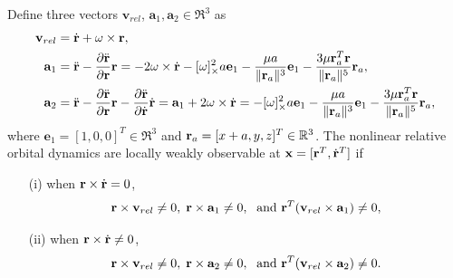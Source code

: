 \begin{prop}
Define three vectors $\mathbf{v}_{rel}$, $\mathbf{a}_1,\mathbf{a}_2\in\Re^3$ as 
\begin{align}
\mathbf{v}_{rel} & = \dot{\mathbf{r}} +\omega\times\mathbf{r},\label{eqn:vrel}\\
\mathbf{a}_1 & = \ddot{\mathbf{r}}-\frac{\partial \ddot{\mathbf{r}}}{\partial \mathbf{r}}\mathbf{r} = -2\omega\times \dot{\mathbf{r}} - [\omega]_\times^2 a \mathbf{e}_1 -\dfrac{\mu a }{\|\mathbf{r}_a\|^3}\mathbf{e}_1- \dfrac{3\mu\mathbf{r}_a^T\mathbf{r}}{\|\mathbf{r}_a\|^5}\mathbf{r}_a,\label{eqn:a1}\\
\mathbf{a}_2 & = \ddot{\mathbf{r}}-\frac{\partial \ddot{\mathbf{r}}}{\partial \mathbf{r}}\mathbf{r} -\frac{\partial \ddot{\mathbf{r}}}{\partial \dot{\mathbf{r}}}\dot{\mathbf{r}} = \mathbf{a}_1+2\omega\times\dot{\mathbf{r}}= - [\omega]_\times^2 a \mathbf{e}_1 -\dfrac{\mu a }{\|\mathbf{r}_a\|^3}\mathbf{e}_1- \dfrac{3\mu\mathbf{r}_a^T\mathbf{r}}{\|\mathbf{r}_a\|^5}\mathbf{r}_a,\label{eqn:a2}
\end{align}
where $\mathbf{e}_1=[1,0,0]^T\in\Re^3$ and $\mathbf{r}_a=[x+a,y,z]^T\in\mathbb{R}^3$. The nonlinear relative orbital dynamics are locally weakly observable at $\mathbf{x}=[\mathbf{r}^T,\dot{\mathbf{r}}^T]$ if
\begin{itemize}
\item[(i)] when $\mathbf{r}\times\dot{\mathbf{r}} =0$, 
\begin{gather}
\mathbf{r}\times\mathbf{v}_{rel}\neq0,\; \mathbf{r}\times\mathbf{a}_1\neq 0,\; \text{ and } \mathbf{r}^T(\mathbf{v}_{rel}\times \mathbf{a}_1)\neq 0,\label{eqn:cond1}
\end{gather}
\item[(ii)] when $\mathbf{r}\times\dot{\mathbf{r}} \neq 0$, 
\begin{gather}
\mathbf{r}\times\mathbf{v}_{rel}\neq0,\; \mathbf{r}\times\mathbf{a}_2\neq 0,\; \text{ and } \mathbf{r}^T(\mathbf{v}_{rel}\times \mathbf{a}_2)\neq 0.\label{eqn:cond2}
\end{gather}
\end{itemize}

\end{prop}

